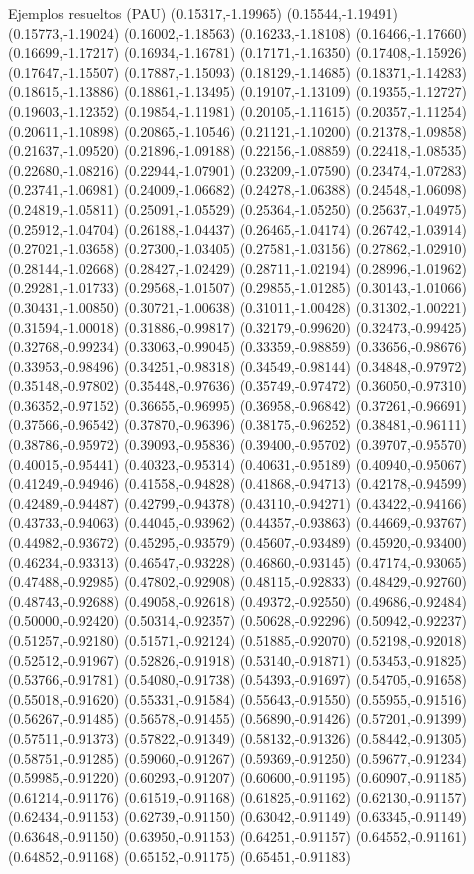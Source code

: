 \documentclass[11pt,a4paper]{article}
\begin{document}
\begin{fmex}{Ejemplos resueltos (PAU)}
(0.15317,-1.19965) (0.15544,-1.19491) (0.15773,-1.19024) (0.16002,-1.18563) (0.16233,-1.18108) (0.16466,-1.17660) (0.16699,-1.17217) (0.16934,-1.16781) (0.17171,-1.16350) (0.17408,-1.15926) (0.17647,-1.15507) (0.17887,-1.15093) (0.18129,-1.14685) (0.18371,-1.14283) (0.18615,-1.13886) (0.18861,-1.13495) (0.19107,-1.13109) (0.19355,-1.12727) (0.19603,-1.12352) (0.19854,-1.11981) (0.20105,-1.11615) (0.20357,-1.11254) (0.20611,-1.10898) (0.20865,-1.10546) (0.21121,-1.10200) (0.21378,-1.09858) (0.21637,-1.09520) (0.21896,-1.09188) (0.22156,-1.08859) (0.22418,-1.08535) (0.22680,-1.08216) (0.22944,-1.07901) (0.23209,-1.07590) (0.23474,-1.07283) (0.23741,-1.06981) (0.24009,-1.06682) (0.24278,-1.06388) (0.24548,-1.06098) (0.24819,-1.05811) (0.25091,-1.05529) (0.25364,-1.05250) (0.25637,-1.04975) (0.25912,-1.04704) (0.26188,-1.04437) (0.26465,-1.04174) (0.26742,-1.03914) (0.27021,-1.03658) (0.27300,-1.03405) (0.27581,-1.03156) (0.27862,-1.02910) (0.28144,-1.02668) (0.28427,-1.02429) (0.28711,-1.02194) (0.28996,-1.01962) (0.29281,-1.01733) (0.29568,-1.01507) (0.29855,-1.01285) (0.30143,-1.01066) (0.30431,-1.00850) (0.30721,-1.00638) (0.31011,-1.00428) (0.31302,-1.00221) (0.31594,-1.00018) (0.31886,-0.99817) (0.32179,-0.99620) (0.32473,-0.99425) (0.32768,-0.99234) (0.33063,-0.99045) (0.33359,-0.98859) (0.33656,-0.98676) (0.33953,-0.98496) (0.34251,-0.98318) (0.34549,-0.98144) (0.34848,-0.97972) (0.35148,-0.97802) (0.35448,-0.97636) (0.35749,-0.97472) (0.36050,-0.97310) (0.36352,-0.97152) (0.36655,-0.96995) (0.36958,-0.96842) (0.37261,-0.96691) (0.37566,-0.96542) (0.37870,-0.96396) (0.38175,-0.96252) (0.38481,-0.96111) (0.38786,-0.95972) (0.39093,-0.95836) (0.39400,-0.95702) (0.39707,-0.95570) (0.40015,-0.95441) (0.40323,-0.95314) (0.40631,-0.95189) (0.40940,-0.95067) (0.41249,-0.94946) (0.41558,-0.94828) (0.41868,-0.94713) (0.42178,-0.94599) (0.42489,-0.94487) (0.42799,-0.94378) (0.43110,-0.94271) (0.43422,-0.94166) (0.43733,-0.94063) (0.44045,-0.93962) (0.44357,-0.93863) (0.44669,-0.93767) (0.44982,-0.93672) (0.45295,-0.93579) (0.45607,-0.93489) (0.45920,-0.93400) (0.46234,-0.93313) (0.46547,-0.93228) (0.46860,-0.93145) (0.47174,-0.93065) (0.47488,-0.92985) (0.47802,-0.92908) (0.48115,-0.92833) (0.48429,-0.92760) (0.48743,-0.92688) (0.49058,-0.92618) (0.49372,-0.92550) (0.49686,-0.92484) (0.50000,-0.92420) (0.50314,-0.92357) (0.50628,-0.92296) (0.50942,-0.92237) (0.51257,-0.92180) (0.51571,-0.92124) (0.51885,-0.92070) (0.52198,-0.92018) (0.52512,-0.91967) (0.52826,-0.91918) (0.53140,-0.91871) (0.53453,-0.91825) (0.53766,-0.91781) (0.54080,-0.91738) (0.54393,-0.91697) (0.54705,-0.91658) (0.55018,-0.91620) (0.55331,-0.91584) (0.55643,-0.91550) (0.55955,-0.91516) (0.56267,-0.91485) (0.56578,-0.91455) (0.56890,-0.91426) (0.57201,-0.91399) (0.57511,-0.91373) (0.57822,-0.91349) (0.58132,-0.91326) (0.58442,-0.91305) (0.58751,-0.91285) (0.59060,-0.91267) (0.59369,-0.91250) (0.59677,-0.91234) (0.59985,-0.91220) (0.60293,-0.91207) (0.60600,-0.91195) (0.60907,-0.91185) (0.61214,-0.91176) (0.61519,-0.91168) (0.61825,-0.91162) (0.62130,-0.91157) (0.62434,-0.91153) (0.62739,-0.91150) (0.63042,-0.91149) (0.63345,-0.91149) (0.63648,-0.91150) (0.63950,-0.91153) (0.64251,-0.91157) (0.64552,-0.91161) (0.64852,-0.91168) (0.65152,-0.91175) (0.65451,-0.91183) 
\end{fmex}
\end{document}
